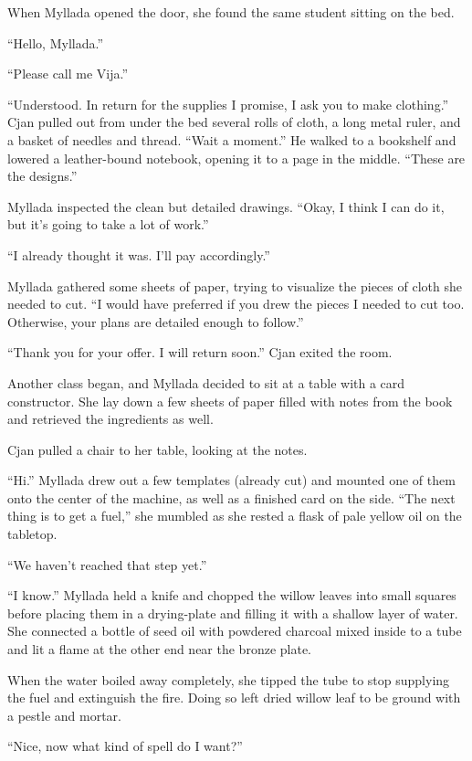 When Myllada opened the door, she found the same student sitting on the bed.

``Hello, Myllada.''

``Please call me Vija.''

``Understood. In return for the supplies I promise, I ask you to make clothing.'' Cjan pulled out from under the bed several rolls of cloth, a long metal ruler, and a basket of needles and thread. ``Wait a moment.'' He walked to a bookshelf and lowered a leather-bound notebook, opening it to a page in the middle. ``These are the designs.''

Myllada inspected the clean but detailed drawings. ``Okay, I think I can do it, but it's going to take a lot of work.''

``I already thought it was. I'll pay accordingly.''

Myllada gathered some sheets of paper, trying to visualize the pieces of cloth she needed to cut. ``I would have preferred if you drew the pieces I needed to cut too. Otherwise, your plans are detailed enough to follow.''

``Thank you for your offer. I will return soon.'' Cjan exited the room.

\centeredstars

Another class began, and Myllada decided to sit at a table with a card constructor. She lay down a few sheets of paper filled with notes from the book and retrieved the ingredients as well.

Cjan pulled a chair to her table, looking at the notes.

``Hi.'' Myllada drew out a few templates (already cut) and mounted one of them onto the center of the machine, as well as a finished card on the side. ``The next thing is to get a fuel,'' she mumbled as she rested a flask of pale yellow oil on the tabletop.

``We haven't reached that step yet.''

``I know.'' Myllada held a knife and chopped the willow leaves into small squares before placing them in a drying-plate and filling it with a shallow layer of water. She connected a bottle of seed oil with powdered charcoal mixed inside to a tube and lit a flame at the other end near the bronze plate.

When the water boiled away completely, she tipped the tube to stop supplying the fuel and extinguish the fire. Doing so left dried willow leaf to be ground with a pestle and mortar.

``Nice, now what kind of spell do I want?''

